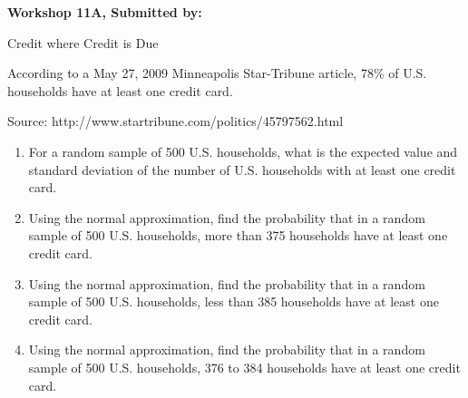 \documentclass[11pt, chapterprefix=true]{scrbook}\usepackage[]{graphicx}\usepackage[]{color}
\begin{document}
\begin{exercises}
\begin{exercise}
\end{exercise} 
\begin{solution}  %

\end{solution}

\clearpage

    \begin{exercise}  %

    \begin{center}
\begin{flushleft}\textbf{\large \hfill Workshop 11A, Submitted by: }\end{flushleft}

\end{center}

Credit where Credit is Due 

According to a May 27, 2009 Minneapolis Star-Tribune article, 78\% of U.S. households have at least one credit card. 

Source: http://www.startribune.com/politics/45797562.html

\begin{enumerate}
  \item For a random sample of 500 U.S. households, what is the expected value and standard deviation of the number of U.S. households with at least one credit card. 
  \item Using the normal approximation, find the probability that in a random sample of 500 U.S. households, more than 375 households have at least one credit card. 
  \item Using the normal approximation, find the probability that in a random sample of 500 U.S. households, less than 385 households have at least one credit card. 
  \item Using the normal approximation, find the probability that in a random sample of 500 U.S. households, 376 to 384 households have at least one credit card. 
\end{enumerate}


\end{exercise}
\end{exercises}
\end{document}

